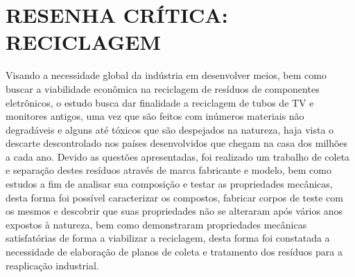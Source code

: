 \documentclass{article}%
\begin{document}
%
\normalsize%
\section{RESENHA CRÍTICA: RECICLAGEM}%
\label{sec:RESENHACRTICARECICLAGEM}%
Visando a necessidade global da indústria em desenvolver meios, bem como buscar a viabilidade econômica na reciclagem de resíduos de componentes eletrônicos, o estudo busca dar finalidade a reciclagem de tubos de TV e monitores antigos, uma vez que são feitos com inúmeros materiais não degradáveis e alguns até tóxicos que são despejados na natureza, haja vista o descarte descontrolado nos países desenvolvidos que chegam na casa dos milhões a cada ano. %
Devido as questões apresentadas, foi realizado um trabalho de coleta e separação destes resíduos através de marca fabricante e modelo, bem como estudos a fim de analisar sua composição e testar as propriedades mecânicas, desta forma foi possível caracterizar os compostos, fabricar corpos de teste com os mesmos e descobrir que suas propriedades não se alteraram após vários anos expostos à natureza, bem como demonstraram propriedades mecânicas satisfatórias de forma a viabilizar a reciclagem, desta forma foi constatada a necessidade de elaboração de planos de coleta e tratamento dos resíduos para a reaplicação industrial.%
\end{document}
